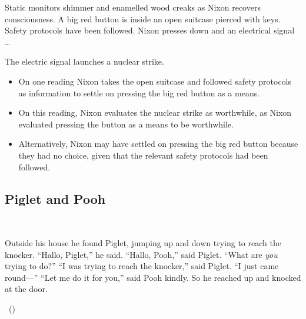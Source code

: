 \documentclass[10pt]{article}
\newcommand{\hozlinedash}[0]{%
  \noindent\hdashrule[0.5ex][c]{\textwidth}{.1pt}{2.5pt}
}
\begin{document}
\begin{scenario}[Nixon]
  Static monitors shimmer and enamelled wood creaks as Nixon recovers consciousness.
  A big red button is inside an open suitcase pierced with keys.
  Safety protocols have been followed.
  Nixon presses down and an electrical signal \dots
\end{scenario}

The electric signal launches a nuclear strike.

\hozlinedash

\begin{itemize}[noitemsep]
\item On one reading Nixon takes the open suitcase and followed safety protocols as information to settle on pressing the big red button as a means.
\item On this reading, Nixon evaluates the nuclear strike as worthwhile, as Nixon evaluated pressing the button as a means to be worthwhile.
\item Alternatively, Nixon may have settled on pressing the big red button because they had no choice, given that the relevant safety protocols had been followed.
\end{itemize}

\subsection{Piglet and Pooh}
\label{sec:piglet-pooh}


\begin{scenario}\mbox{ }

  \noindent Outside his house he found Piglet, jumping up and down trying to reach the knocker.\newline
  ``Hallo, Piglet,'' he said.\newline
  ``Hallo, Pooh,'' said Piglet.\newline
  ``What are \emph{you} trying to do?''\newline
  ``I was trying to reach the knocker,'' said Piglet.
  ``I just came round---''\newline
  ``Let me do it for you,'' said Pooh kindly.
  So he reached up and knocked at the door.

  \mbox{ }\hfill\mbox{(\cite[77--78]{Milne:2009aa})}
\end{scenario}

\begin{center}
\end{center}
\end{document}
